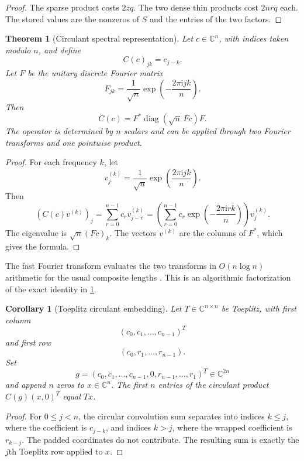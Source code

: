 \documentclass{aomart}
\newtheorem{theorem}{Theorem}[section]
\newtheorem{corollary}[corollary]{Corollary}
\theoremstyle{definition}
\theoremstyle{remark}
\newcommand{\CC}{\mathbb C}
\newcommand{\diag}{\operatorname{diag}}
\newcommand{\ii}{\mathrm i}
\begin{document}
\begin{proof}
The sparse product costs \(2zq\). The two dense thin products cost \(2nrq\) each. The stored values are the nonzeros of \(S\) and the entries of the two factors.
\end{proof}

\begin{theorem}[Circulant spectral representation]\label{thm:circulant}
Let \(c\in\CC^n\), with indices taken modulo \(n\), and define
\[
C(c)_{jk}=c_{j-k}.
\]
Let \(F\) be the unitary discrete Fourier matrix
\[
F_{jk}
=
\frac{1}{\sqrt n}
\exp\left(-\frac{2\pi\ii jk}{n}\right).
\]
Then
\[
\boxed{
C(c)
=
F^*\diag(\sqrt n\,Fc)F.
}
\]
The operator is determined by \(n\) scalars and can be applied through two Fourier transforms and one pointwise product.
\end{theorem}

\begin{proof}
For each frequency \(k\), let
\[
v^{(k)}_j
=
\frac{1}{\sqrt n}
\exp\left(\frac{2\pi\ii jk}{n}\right).
\]
Then
\[
(C(c)v^{(k)})_j
=
\sum_{r=0}^{n-1}c_rv^{(k)}_{j-r}
=
\left(
\sum_{r=0}^{n-1}
c_r\exp\left(-\frac{2\pi\ii rk}{n}\right)
\right)v^{(k)}_j.
\]
The eigenvalue is \(\sqrt n(Fc)_k\). The vectors \(v^{(k)}\) are the columns of \(F^*\), which gives the formula.
\end{proof}

The fast Fourier transform evaluates the two transforms in \(O(n\log n)\) arithmetic for the usual composite lengths \cite{CooleyTukey1965}. This is an algorithmic factorization of the exact identity in \cref{thm:circulant}.

\begin{corollary}[Toeplitz circulant embedding]\label{cor:toeplitz_embedding}
Let \(T\in\CC^{n\times n}\) be Toeplitz, with first column
\[
(c_0,c_1,\ldots,c_{n-1})^T
\]
and first row
\[
(c_0,r_1,\ldots,r_{n-1}).
\]
Set
\[
g
=
(c_0,c_1,\ldots,c_{n-1},0,r_{n-1},\ldots,r_1)^T
\in\CC^{2n}
\]
and append \(n\) zeros to \(x\in\CC^n\). The first \(n\) entries of the circulant product \(C(g)(x,0)^T\) equal \(Tx\).
\end{corollary}

\begin{proof}
For \(0\leq j<n\), the circular convolution sum separates into indices \(k\leq j\), where the coefficient is \(c_{j-k}\), and indices \(k>j\), where the wrapped coefficient is \(r_{k-j}\). The padded coordinates do not contribute. The resulting sum is exactly the \(j\)th Toeplitz row applied to \(x\).
\end{proof}
\end{document}
